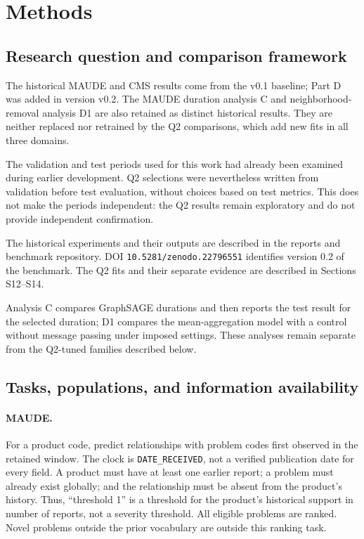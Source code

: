 \section{Methods}
\label{sec:methods}

\subsection{Research question and comparison framework}

The historical MAUDE and CMS results come from the v0.1 baseline; Part D was added in version v0.2. The MAUDE duration analysis C and neighborhood-removal analysis D1 are also retained as distinct historical results. They are neither replaced nor retrained by the Q2 comparisons, which add new fits in all three domains.

The validation and test periods used for this work had already been examined during earlier development. Q2 selections were nevertheless written from validation before test evaluation, without choices based on test metrics. This does not make the periods independent: the Q2 results remain exploratory and do not provide independent confirmation.

The historical experiments and their outputs are described in the reports and benchmark repository\cite{hgb2026,hgbcontract,hgbresults,hgbpartd,hgbanalysis,hgbcode}. DOI \nolinkurl{10.5281/zenodo.22796551} identifies version 0.2 of the benchmark. The Q2 fits and their separate evidence are described in Sections S12--S14\cite{hgbq2methods}.

Analysis C compares GraphSAGE durations and then reports the test result for the selected duration; D1 compares the mean-aggregation model with a control without message passing under imposed settings. These analyses remain separate from the Q2-tuned families described below.

\subsection{Tasks, populations, and information availability}
\label{sec:tasks}

\paragraph{MAUDE.} For a product code, predict relationships with problem codes first observed in the retained window. The clock is \texttt{DATE\_RECEIVED}, not a verified publication date for every field. A product must have at least one earlier report; a problem must already exist globally; and the relationship must be absent from the product's history. Thus, “threshold 1” is a threshold for the product's historical support in number of reports, not a severity threshold. All eligible problems are ranked. Novel problems outside the prior vocabulary are outside this ranking task\cite{hgbcontract,hgbcode}.

